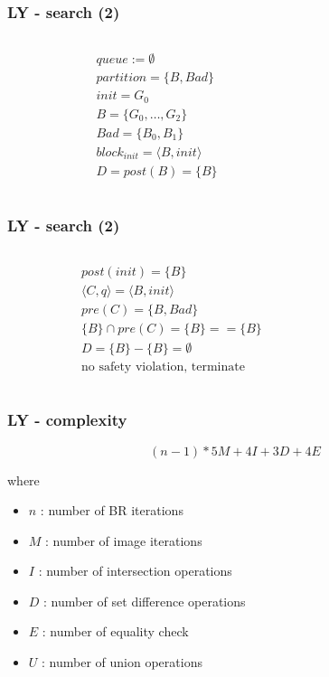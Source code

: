 \documentclass[11pt,handout]{beamer}
\begin{document}
\begin{frame}[fragile]
  \frametitle{LY - search (2)}
  \begin{columns}
    \begin{column}{0.5\textwidth}
      \begin{align*}
        & queue := \emptyset \\
        & partition = \{B, Bad\} \\
        & init = G_0 \\
        & B = \{G_0,\dots,G_2\}\\
        & Bad = \{B_0,B_1\} \\
        & block_{init} = \langle B,init \rangle \\
        & D = post(B) = \{ B \}
      \end{align*}
    \end{column}
    \begin{column}{0.5\textwidth}%
      
    \end{column}
  \end{columns}
\end{frame}
  
\begin{frame}[fragile]
  \frametitle{LY - search (2)}
  \begin{columns}
    \begin{column}{0.5\textwidth}
      \begin{align*}
        & post(init) = \{B\} \\
        & \langle {C,q} \rangle = \langle {B,init} \rangle \\
        & pre(C) = \{ B , Bad\} \\
        & \{B\} \cap pre(C) = \{B\} == \{B\} \\
        & D = \{B\} - \{B\} = \emptyset \\
        & \text{no safety violation, terminate}
      \end{align*}
    \end{column}
    \begin{column}{0.5\textwidth}%
      
    \end{column}
  \end{columns}
\end{frame}


\begin{frame}
  \frametitle{LY - complexity}
  \[
    (n-1) * 5M + 4I + 3D + 4E
  \]

  where

  \begin{itemize}
  \item $n$ : number of BR iterations
  \item $M$ : number of image iterations
  \item $I$ : number of intersection operations
  \item $D$ : number of set difference operations
  \item $E$ : number of equality check
  \item $U$ : number of union operations
  \end{itemize}
\end{frame}
\end{document}

